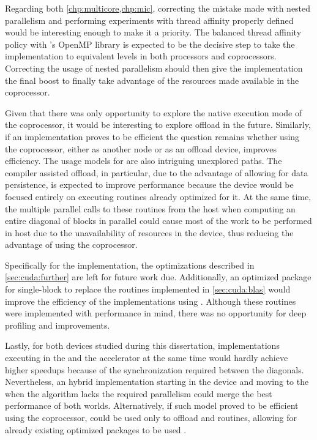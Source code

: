 \documentclass[../thesis]{subfiles}
\begin{document}
	Regarding both \cref{chp:multicore,chp:mic}, correcting the mistake made with nested parallelism and performing experiments with thread affinity properly defined would be interesting enough to make it a priority. The balanced thread affinity policy with \intel's OpenMP library is expected to be the decisive step to take the implementation to equivalent levels in both \xeon processors and \intel\xeonphi coprocessors. Correcting the usage of nested parallelism should then give the implementation the final boost to finally take advantage of the resources made available in the coprocessor.

	Given that there was only opportunity to explore the native execution mode of the \intel\xeonphi coprocessor, it would be interesting to explore offload in the future. Similarly, if an \mpi implementation proves to be efficient the question remains whether using the coprocessor, either as another node or as an offload device, improves efficiency. The usage models for \intel\mkl are also intriguing unexplored paths. The compiler assisted offload, in particular, due to the advantage of allowing for data persistence, is expected to improve performance because the device would be focused entirely on executing routines already optimized for it. At the same time, the multiple parallel calls to these routines from the host when computing an entire diagonal of blocks in parallel could cause most of the work to be performed in host due to the unavailability of resources in the device, thus reducing the advantage of using the coprocessor.

	Specifically for the \cuda implementation, the optimizations described in \cref{sec:cuda:further} are left for future work due. Additionally, an optimized \blas package for single-block to replace the routines implemented in \cref{sec:cuda:blas} would improve the efficiency of the implementations using \gpus. Although these routines were implemented with performance in mind, there was no opportunity for deep profiling and improvements.

	Lastly, for both devices studied during this dissertation, implementations executing in the \cpus and the accelerator at the same time would hardly achieve higher speedups because of the synchronization required between the diagonals. Nevertheless, an hybrid implementation starting in the device and moving to the \cpu when the algorithm lacks the required parallelism could merge the best performance of both worlds. Alternatively, if such model proved to be efficient using the \intel\xeonphi coprocessor, \nvidia\gpus could be used only to offload \blas and \lapack routines, allowing for already existing optimized packages to be used \cite{NVIDIA:CUBLAS:5:0,PLASMA:MAGMA,CULA:LAPACK}.
\end{document}

